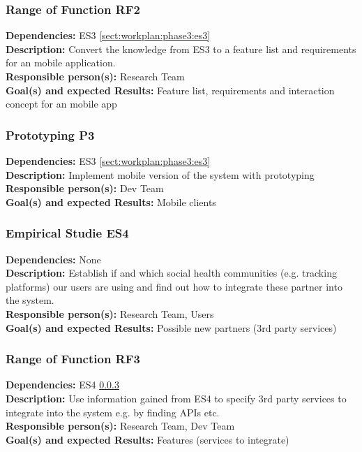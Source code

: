 \documentclass[a4paper,11pt]{article}
\begin{document}
\subsubsection{Range of Function RF2}
\label{sect:workplan:phase3:rf2}
\textbf{Dependencies:} ES3 \ref{sect:workplan:phase3:es3}\\
\textbf{Description:} Convert the knowledge from ES3 to a feature list and requirements for an mobile application.\\
\textbf{Responsible person(s):} Research Team\\
\textbf{Goal(s) and expected Results:} Feature list, requirements and interaction concept for an mobile app\\

\subsubsection{Prototyping P3}
\label{sect:workplan:phase3:p3}
\textbf{Dependencies:} ES3 \ref{sect:workplan:phase3:es3}\\
\textbf{Description:} Implement mobile version of the system with prototyping\\
\textbf{Responsible person(s):} Dev Team\\
\textbf{Goal(s) and expected Results:} Mobile clients\\

\subsubsection{Empirical Studie ES4}
\label{sect:workplan:phase3:es4}
\textbf{Dependencies:} None\\
\textbf{Description:} Establish if and which social health communities (e.g. tracking platforms) our users are using and find out how to integrate these partner into the system. \\
\textbf{Responsible person(s):} Research Team, Users\\
\textbf{Goal(s) and expected Results:} Possible new partners (3rd party services)\\

\subsubsection{Range of Function RF3}
\label{sect:workplan:phase3:rf3}
\textbf{Dependencies:} ES4 \ref{sect:workplan:phase3:es4}\\
\textbf{Description:} Use information gained from ES4 to specify 3rd party services to integrate into the system e.g. by finding APIs etc.\\
\textbf{Responsible person(s):} Research Team, Dev Team\\
\textbf{Goal(s) and expected Results:} Features (services to integrate)\\
\end{document}
